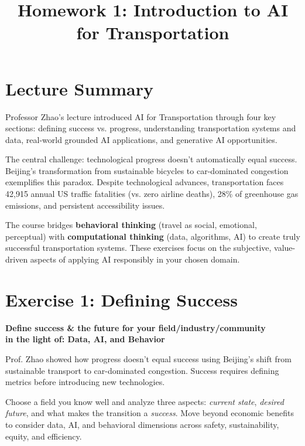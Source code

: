 \documentclass[11pt]{article}
\title{Homework 1: Introduction to AI for Transportation}
\begin{document}
\maketitle

\section*{Lecture Summary}

Professor Zhao's lecture introduced AI for Transportation through four key sections: defining success vs. progress, understanding transportation systems and data, real-world grounded AI applications, and generative AI opportunities.

The central challenge: technological progress doesn't automatically equal success. Beijing's transformation from sustainable bicycles to car-dominated congestion exemplifies this paradox. Despite technological advances, transportation faces 42,915 annual US traffic fatalities (vs. zero airline deaths), 28\% of greenhouse gas emissions, and persistent accessibility issues.

The course bridges \textbf{behavioral thinking} (travel as social, emotional, perceptual) with \textbf{computational thinking} (data, algorithms, AI) to create truly successful transportation systems. These exercises focus on the subjective, value-driven aspects of applying AI responsibly in your chosen domain.

\section*{Exercise 1: Defining Success}

\begin{center}
\textbf{\Large Define success \& the future for your field/industry/community \\
in the light of: Data, AI, and Behavior}
\end{center}

Prof. Zhao showed how progress doesn't equal success using Beijing's shift from sustainable transport to car-dominated congestion. Success requires defining metrics before introducing new technologies.

Choose a field you know well and analyze three aspects: \textit{current state}, \textit{desired future}, and what makes the transition a \textit{success}. Move beyond economic benefits to consider data, AI, and behavioral dimensions across safety, sustainability, equity, and efficiency.
\end{document}
